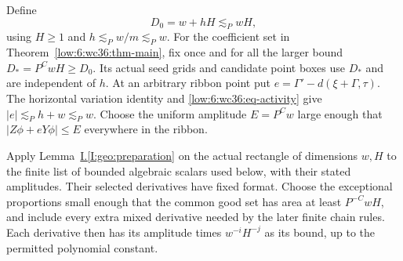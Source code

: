 \documentclass[11pt]{amsart}
\theoremstyle{definition}
\theoremstyle{remark}
\numberwithin{equation}{section}
\newcommand{\partIref}[1]{\hyperref[I:#1]{I.\ref*{I:#1}}}
\begin{document}
Define
\begin{equation}\label{low:6:wc36:eq-D0}
D_0=w+hH\lesssim_P wH,
\end{equation}
using $H\ge1$ and $h\lesssim_P w/m\lesssim_P w$. For the coefficient set in Theorem~\ref{low:6:wc36:thm-main}, fix once and for all the larger bound $D_*=P^CwH\ge D_0$. Its actual seed grids and candidate point boxes use $D_*$ and are independent of $h$. At an arbitrary ribbon point put $e=\Gamma'-d(\xi+\Gamma,\tau)$. The horizontal variation identity and \eqref{low:6:wc36:eq-activity} give $|e|\lesssim_P h+w\lesssim_P w$. Choose the uniform amplitude $E=P^Cw$ large enough that $|Z\phi+eY\phi|\le E$ everywhere in the ribbon.

Apply Lemma~\partIref{geo:preparation} on the actual rectangle of dimensions $w,H$ to the finite list of bounded algebraic scalars used below, with their stated amplitudes. Their selected derivatives have fixed format. Choose the exceptional proportions small enough that the common good set has area at least $P^{-C}wH$, and include every extra mixed derivative needed by the later finite chain rules. Each derivative then has its amplitude times $w^{-i}H^{-j}$ as its bound, up to the permitted polynomial constant.
\end{document}

